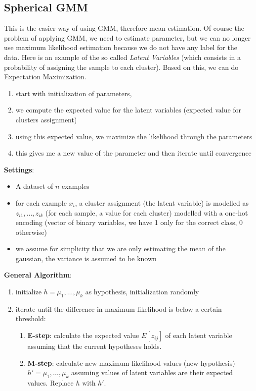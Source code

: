         \subsection{Spherical GMM}
            This is the easier way of using GMM, therefore mean estimation. Of course the problem of applying GMM, we need to estimate parameter, but we can no longer use maximum likelihood estimation because we do not have any label for the data. 
            Here is an example of the so called \textit{Latent Variables} (which consists in a probability of assigning the sample to each cluster). Based on this, we can do Expectation Maximization.
            \begin{enumerate}
                \item start with initialization of parameters, 
                \item we compute the expected value for the latent variables (expected value for clusters assignment)
                \item using this expected value, we maximize the likelihood through the parameters
                \item this gives me a new value of the parameter and then iterate until convergence
            \end{enumerate}
            

            \textbf{Settings}:
            \begin{itemize}
                \item A dataset of $n$ examples
                \item for each example $x_i$, a cluster assignment (the latent variable) is modelled as $z_{i1}, \dots, z_{ik}$ (for each sample, a value for each cluster) modelled with a one-hot encoding (vector of binary variables, we have 1 only for the correct class, 0 otherwise)
                \item we assume for simplicity that we are only estimating the mean of the gaussian, the variance is assumed to be known
            \end{itemize}
            

            \textbf{General Algorithm}:
            \begin{enumerate}
                \item initialize $h = {\mu_1, \dots, \mu_k}$ as hypothesis, initialization randomly
                \item iterate until the difference in maximum likelihood is below a certain threshold:
                \begin{enumerate}
                    \item \textbf{E-step}: calculate the expected value $E[z_{ij}]$ of each latent variable assuming that the current hypotheses holds.
                    \item \textbf{M-step}: calculate new maximum likelihood values (new hypothesis) $h' = {\mu_1, \dots, \mu_k}$ assuming values of latent variables are their expected values. Replace $h$ with $h'$.
                \end{enumerate}
            \end{enumerate}
            

